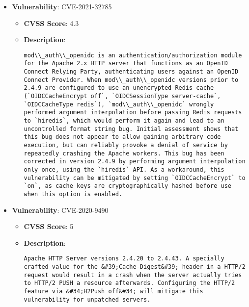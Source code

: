 \documentclass{article}
\begin{document}
\begin{itemize}
        \item \textbf{Vulnerability}: CVE-2021-32785
        \begin{itemize}
            \item \textbf{CVSS Score}:  4.3 
            \item \textbf{Description}:
            \parbox[t]{0.9\linewidth}{
                \verb|mod\\_auth\\_openidc is an authentication/authorization module for the Apache 2.x HTTP server that functions as an OpenID Connect Relying Party, authenticating users against an OpenID Connect Provider. When mod\\_auth\\_openidc versions prior to 2.4.9 are configured to use an unencrypted Redis cache (`OIDCCacheEncrypt off`, `OIDCSessionType server-cache`, `OIDCCacheType redis`), `mod\\_auth\\_openidc` wrongly performed argument interpolation before passing Redis requests to `hiredis`, which would perform it again and lead to an uncontrolled format string bug. Initial assessment shows that this bug does not appear to allow gaining arbitrary code execution, but can reliably provoke a denial of service by repeatedly crashing the Apache workers. This bug has been corrected in version 2.4.9 by performing argument interpolation only once, using the `hiredis` API. As a workaround, this vulnerability can be mitigated by setting `OIDCCacheEncrypt` to `on`, as cache keys are cryptographically hashed before use when this option is enabled.|
            }
        \end{itemize}
    
        \item \textbf{Vulnerability}: CVE-2020-9490
        \begin{itemize}
            \item \textbf{CVSS Score}:  5 
            \item \textbf{Description}:
            \parbox[t]{0.9\linewidth}{
                \verb|Apache HTTP Server versions 2.4.20 to 2.4.43. A specially crafted value for the &#39;Cache-Digest&#39; header in a HTTP/2 request would result in a crash when the server actually tries to HTTP/2 PUSH a resource afterwards. Configuring the HTTP/2 feature via &#34;H2Push off&#34; will mitigate this vulnerability for unpatched servers.|
            }
        \end{itemize}
    

\end{itemize}
\end{document}
